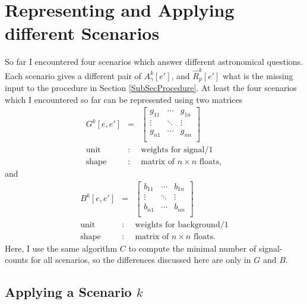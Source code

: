 \documentclass{article}%
\begin{document}
    \section{Representing and Applying different Scenarios}
        So far I encountered four scenarios which answer different astronomical questions.
        Each scenario gives a different pair of $A^k_\gamma[e']$, and $\hat{R}^k_p[e']$ what is the missing input to the procedure in Section \ref{SubSecProcedure}.
        At least the four scenarios which I encountered so far can be represented using two matrices
        \begin{eqnarray*}
            G^k[e, e'] &=&
              \left[ {\begin{array}{ccc}
                g_{11} & \cdots & g_{1n}\\
                \vdots & \ddots & \vdots\\
                g_{n1} & \cdots & g_{nn}\\
              \end{array} } \right]\\
            \text{unit} &:& \text{weights for signal}/1\\
            \text{shape} &:& \text{matrix of}\,\,n \times n \,\,\text{floats},
        \end{eqnarray*}
        and
        \begin{eqnarray*}
            B^k[e, e'] &=&
              \left[ {\begin{array}{cccc}
                b_{11} & \cdots & b_{1n}\\
                \vdots & \ddots & \vdots\\
                b_{n1} & \cdots & b_{nn}\\
              \end{array} } \right]\\
            \text{unit} &:& \text{weights for background}/1\\
            \text{shape} &:& \text{matrix of}\,\,n \times n \,\,\text{floats}.
        \end{eqnarray*}
        Here, I use the same algorithm $C$ to compute the minimal number of signal-counts for all scenarios, so the differences discussed here are only in $G$ and $B$.
        \subsection{Applying a Scenario $k$}
\end{document}
